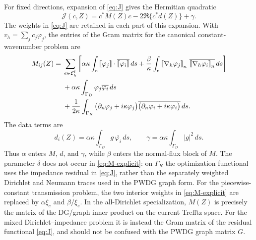 \documentclass[pdflatex,sn-mathphys-num]{sn-jnl}
\theoremstyle{thmstyleone}
\theoremstyle{thmstyletwo}
\newcommand{\Ei}{\mathcal E_h^{\rm I}}
\newcommand{\jump}[1]{\left[\!\left[#1\right]\!\right]}
\newcommand{\jumpn}[1]{\left[\!\left[#1\right]\!\right]_{n}}
\begin{document}
For fixed directions, expansion of \eqref{eq:J} gives the Hermitian quadratic
\begin{equation}\label{eq:Jquadratic}
 {\mathcal J(c,Z)=c^*M(Z)c-2\Re\{c^*d(Z)\}+\gamma.}
\end{equation}
The weights in \eqref{eq:J} are retained in each part of this expansion.  With
$v_h=\sum_j c_j\varphi_j$, the entries of the Gram matrix for the canonical
constant-wavenumber problem are
\begin{align}\label{eq:M-explicit}
 M_{ij}(Z)={}&
 \sum_{e\in\Ei}\left[
 \alpha\kappa\int_e \jump{\varphi_j}\cdot\overline{\jump{\varphi_i}}\,ds
 +\frac{\beta}{\kappa}\int_e
 \jumpn{\nabla_h\varphi_j}\,\overline{\jumpn{\nabla_h\varphi_i}}\,ds
 \right] \nonumber\\
 &+\alpha\kappa\int_{\Gamma_D}\varphi_j\overline{\varphi_i}\,ds \nonumber\\
 &+\frac{1}{2\kappa}\int_{\Gamma_R}
 \big(\partial_n\varphi_j+i\kappa\varphi_j\big)
 \overline{\big(\partial_n\varphi_i+i\kappa\varphi_i\big)}\,ds .
\end{align}
The data terms are
\begin{equation}\label{eq:d-gamma-explicit}
 d_i(Z)=\alpha\kappa\int_{\Gamma_D}g\,\overline{\varphi_i}\,ds,
 \qquad
 \gamma=\alpha\kappa\int_{\Gamma_D}|g|^2\,ds.
\end{equation}
Thus $\alpha$ enters $M$, $d$, and $\gamma$, while $\beta$ enters the
normal-flux block of $M$.  The parameter $\delta$ does not occur in
\eqref{eq:M-explicit}: on $\Gamma_R$ the optimization functional uses the
impedance residual in \eqref{eq:J}, rather than the separately weighted
Dirichlet and Neumann traces used in the PWDG graph form.  For the
piecewise-constant transmission problem, the two interior weights in
\eqref{eq:M-explicit} are replaced by $\alpha\xi_e$ and $\beta/\xi_e$.
In the all-Dirichlet specialization, $M(Z)$ is precisely the matrix of the
DG/graph inner product on the current Trefftz space.  For the mixed
Dirichlet--impedance problem it is instead the Gram matrix of the residual
functional \eqref{eq:J}, and should not be confused with the PWDG graph matrix $G$.
\end{document}
